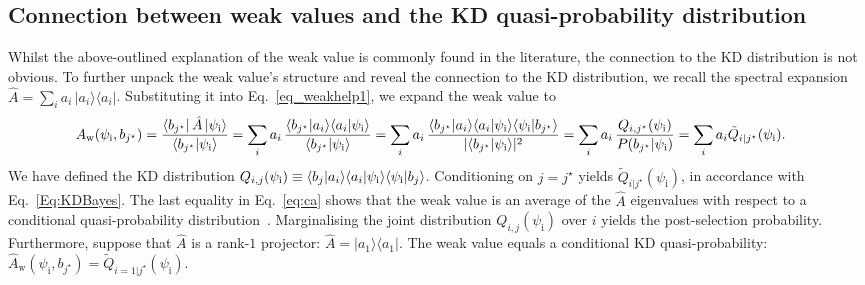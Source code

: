 \documentclass[%
 reprint,
superscriptaddress,
nofootinbib,
bibnotes,
 amsmath,amssymb,
 aps,
]{revtex4-1}
\theoremstyle{plain}
\newcommand*{\ketbra}[2]{\lvert #1 \rangle\!\langle #2 \rvert}
\begin{document}
\subsection{Connection between weak values and the KD quasi-probability distribution}
\label{SubSec:WVKD}
Whilst the above-outlined 
explanation of the  weak value is commonly found in the literature, the connection to the KD distribution is not obvious. To further unpack the weak value's structure and reveal the connection to the KD distribution, we recall the spectral expansion 
$\hat{A} = \sum_i a_i \,\ketbra{a_i}{a_i}$. Substituting it into Eq.~\eqref{eq_weakhelp1}, we expand the weak value to
\begin{align}\label{eq:ca}
    A_{\mathrm{w}}(\psi_{\mathrm{i}},b_{j^{\star}}) &= \frac{\bra{b_{j^{\star}}}\hat{A}\ket{\psi_{\mathrm{i}}}}{\braket{b_{j^{\star}}|\psi_{\mathrm{i}}}} = \sum_i a_i \,\frac{\braket{b_{j^{\star}}|a_i}\!\braket{a_i|\psi_{\mathrm{i}}}}{\braket{b_{j^{\star}}|\psi_{\mathrm{i}}}} = \sum_i a_i\,\frac{\braket{b_{j^{\star}}|a_i}\!\braket{a_i|\psi_{\mathrm{i}}}\!\braket{\psi_{\mathrm{i}}|b_{j^{\star}}}}{|\!\braket{b_{j^{\star}}|\psi_{\mathrm{i}}}\!|^2} = \sum_i a_i \,\frac{ Q_{i,j^{\star}}(\psi_{\mathrm{i}}) }{P(b_{j^{\star}}|\psi_{\mathrm{i}})} = \sum_i a_i \tilde{Q}_{i|j^{\star}}(\psi_{\mathrm{i}}) . 
\end{align}
We have defined the KD distribution $Q_{i,j}(\psi_{\mathrm{i}}) \equiv \braket{b_{j}|a_i}\!\braket{a_i|\psi_{\mathrm{i}}}\!\braket{\psi_{\mathrm{i}}|b_{j}}$. Conditioning on $j=j^{\star}$ yields $\tilde{Q}_{i|j^{\star}}(\psi_{\mathrm{i}})$, in accordance with Eq.~\eqref{Eq:KDBayes}. 
The last equality in Eq.~\eqref{eq:ca} shows that the weak value is an average of the $\hat{A}$ eigenvalues with respect to a conditional quasi-probability distribution~\cite{Dressel15}. 
Marginalising the joint distribution $Q_{i,j}(\psi_{\mathrm{i}})$ over $i$ yields the post-selection probability. 
Furthermore, suppose that $\hat{A}$ is a rank-$1$ projector:  $\hat{A} = \ketbra{a_1}{a_1}$. The weak value equals a conditional KD quasi-probability: $\hat{A}_\mathrm{w} (\psi_{\mathrm{i}},b_{j^{\star}}) = \tilde{Q}_{i=1|j^{\star}}(\psi_{\mathrm{i}}) $.
\end{document}
